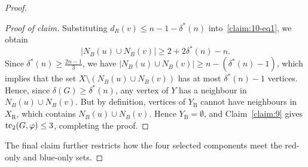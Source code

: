 \documentclass[12pt,reqno,a4paper]{amsart}
\newenvironment{claimproof}[1][Proof of claim]{\begin{proof}[#1]\renewcommand{\qedsymbol}{$\scriptstyle\square$}}{\end{proof}}
\def\tc{\mathop{\text{\rm tc}}\nolimits}
\newcommand{\R}{\mathrm{R}}
\newcommand{\B}{\mathrm{B}}
\begin{document}
\begin{proof}
\begin{claimproof}
Substituting $d_R(v)\le n-1-\delta^*(n)$ into~\eqref{claim:10-eq1}, we obtain
\begin{equation*}
|N_B(u) \cup N_B(v)| \ge 2 + 2\delta^*(n) - n.
\end{equation*}
Since $\delta^*(n) \ge \frac{2n-1}{3}$, we have $|N_B(u) \cup N_B(v)| \ge n -
(\delta^*(n) - 1)$, which implies that the set $X \setminus (N_B(u) \cup
N_B(v))$ has at most $\delta^*(n) - 1$ vertices. Hence, since $\delta(G)\geq
\delta^*(n)$, any vertex of $Y$ has a neighbour in $N_B(u) \cup N_B(v)$. But by
definition, vertices of $Y_{\B}$ cannot have neighbours in $X_{\R}$, which
contains $N_B(u)\cup N_B(v)$. Hence $Y_{\B}=\emptyset$, and Claim~\ref{claim:9}
gives $\tc_2(G,\varphi)\le3$, completing the proof.
\end{claimproof}

The final claim further restricts how the four selected components meet the
red-only and blue-only sets.


\end{proof}
\end{document}
